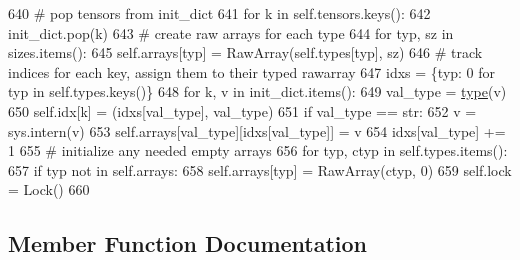 \begin{DoxyCode}
640             \textcolor{comment}{# pop tensors from init\_dict}
641             \textcolor{keywordflow}{for} k \textcolor{keywordflow}{in} self.tensors.keys():
642                 init\_dict.pop(k)
643             \textcolor{comment}{# create raw arrays for each type}
644             \textcolor{keywordflow}{for} typ, sz \textcolor{keywordflow}{in} sizes.items():
645                 self.arrays[typ] = RawArray(self.types[typ], sz)
646             \textcolor{comment}{# track indices for each key, assign them to their typed rawarray}
647             idxs = \{typ: 0 \textcolor{keywordflow}{for} typ \textcolor{keywordflow}{in} self.types.keys()\}
648             \textcolor{keywordflow}{for} k, v \textcolor{keywordflow}{in} init\_dict.items():
649                 val\_type = \hyperlink{namespaceparlai_1_1agents_1_1tfidf__retriever_1_1build__tfidf_ad5dfae268e23f506da084a9efb72f619}{type}(v)
650                 self.idx[k] = (idxs[val\_type], val\_type)
651                 \textcolor{keywordflow}{if} val\_type == str:
652                     v = sys.intern(v)
653                 self.arrays[val\_type][idxs[val\_type]] = v
654                 idxs[val\_type] += 1
655         \textcolor{comment}{# initialize any needed empty arrays}
656         \textcolor{keywordflow}{for} typ, ctyp \textcolor{keywordflow}{in} self.types.items():
657             \textcolor{keywordflow}{if} typ \textcolor{keywordflow}{not} \textcolor{keywordflow}{in} self.arrays:
658                 self.arrays[typ] = RawArray(ctyp, 0)
659         self.lock = Lock()
660 
\end{DoxyCode}


\subsection{Member Function Documentation}
\mbox{\label{classparlai_1_1agents_1_1legacy__agents_1_1seq2seq_1_1utils__v0_1_1SharedTable_ac40e68dfcfa7680874ee1088642e16ff}} 
